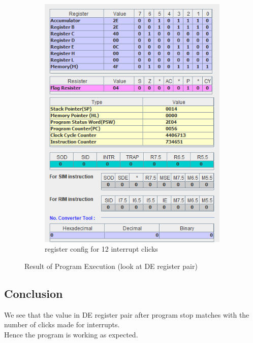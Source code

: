 \documentclass[a4paper]{article} %
\begin{document}
\begin{figure}[h!]
            \begin{subfigure}[b]{0.49\linewidth}
                \centering
                \includegraphics[width=\linewidth]{Assignment 5/1_ISR/12-click.png}
                \caption{register config for 12 interrupt clicks}
                \label{fg11b}
            \end{subfigure}
            \caption{Result of Program Execution (look at DE register pair)}
            \label{fg11}
        \end{figure}
    \subsection{Conclusion}
        We see that the value in DE register pair after program stop matches with the number of clicks made for interrupts.\\
        Hence the program is working as expected.
\newpage
\end{document}
